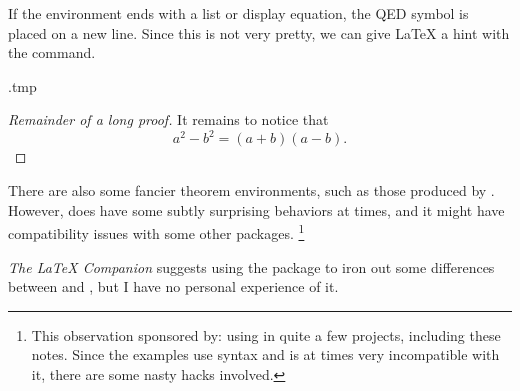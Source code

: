 If the environment ends with a list or display equation,
the QED symbol is placed on a new line.
Since this is not very pretty, we can give \LaTeX{} a hint with the  command.
%
\begin{VerbatimOut}{\jobname.tmp}
\newcommand{\qedhere}{}

\begin{proof}[Remainder of a long proof]
It remains to notice that
\[
a^2 - b^2 = (a+b)(a-b).
\qedhere
\]
\end{proof}
\end{VerbatimOut}
\ShowExampleBelow[3]


There are also some fancier theorem environments,
such as those produced by .
However,  does have some subtly surprising behaviors at times,
and it might have compatibility issues with some other packages.%
\footnote{This observation sponsored by: using  in quite a few projects,
including these notes.
Since the examples use  syntax and  is at times very incompatible with it,
there are some nasty hacks involved.}

\emph{The \LaTeX{} Companion} \cite[Section~4.1.5]{TLC} suggests using the 
package to iron out some differences between  and ,
but I have no personal experience of it.

